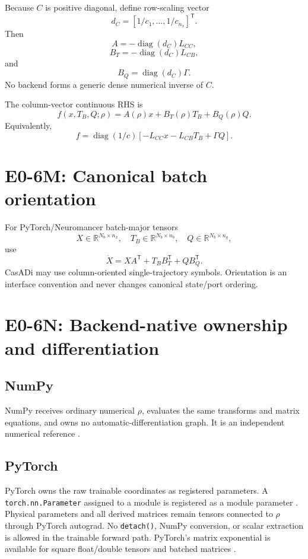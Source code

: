\documentclass[11pt]{article}
\newcommand{\R}{\mathbb{R}}
\newcommand{\diagmat}{\operatorname{diag}}
\begin{document}
Because $C$ is positive diagonal, define row-scaling vector
\[
d_C=[1/c_1,\ldots,1/c_{n_x}]^{\mathsf T}.
\]
Then
\[
\boxed{A=-\diagmat(d_C)L_{CC}},
\]
\[
\boxed{B_T=-\diagmat(d_C)L_{CB}},
\]
and
\[
\boxed{B_Q=\diagmat(d_C)\Gamma.}
\]
No backend forms a generic dense numerical inverse of $C$.

The column-vector continuous RHS is
\[
\boxed{
f(x,T_B,Q;\rho)=A(\rho)x+B_T(\rho)T_B+B_Q(\rho)Q.
}
\]
Equivalently,
\[
\boxed{
f=\diagmat(1/c)
\left[-L_{CC}x-L_{CB}T_B+\Gamma Q\right].
}
\]

\section{E0-6M: Canonical batch orientation}

For PyTorch/Neuromancer batch-major tensors
\[
X\in\R^{N_b\times n_x},\quad
T_B\in\R^{N_b\times n_b},\quad
Q\in\R^{N_b\times n_q},
\]
use
\[
\boxed{
\dot X=XA^{\mathsf T}+T_BB_T^{\mathsf T}+QB_Q^{\mathsf T}.
}
\]
CasADi may use column-oriented single-trajectory symbols. Orientation is an
interface convention and never changes canonical state/port ordering.

\section{E0-6N: Backend-native ownership and differentiation}

\subsection{NumPy}
NumPy receives ordinary numerical $\rho$, evaluates the same transforms and
matrix equations, and owns no automatic-differentiation graph. It is an
independent numerical reference \cite{Harris2020NumPy}.

\subsection{PyTorch}
PyTorch owns the raw trainable coordinates as registered parameters. A
\texttt{torch.nn.Parameter} assigned to a module is registered as a module
parameter \cite{PyTorchParameterDocs2026}. Physical parameters and all derived
matrices remain tensors connected to $\rho$ through PyTorch autograd. No
\texttt{detach()}, NumPy conversion, or scalar extraction is allowed in the
trainable forward path. PyTorch's matrix exponential is available for square
float/double tensors and batched matrices \cite{PyTorchMatrixExpDocs2026}.
\end{document}
